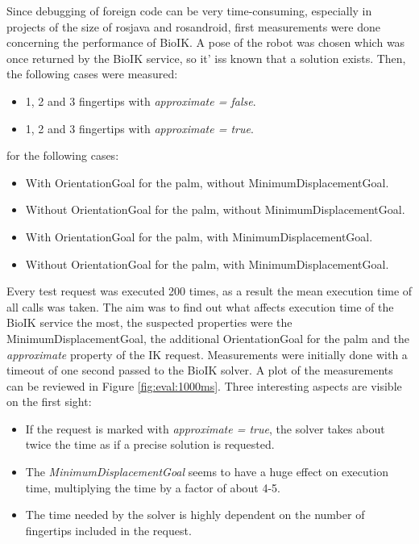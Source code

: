 Since debugging of foreign code can be very time-consuming, especially in projects of the size of rosjava and rosandroid, first measurements were done concerning the performance of BioIK. A pose of the robot was chosen which was once returned by the BioIK service, so it' iss known that a solution exists. Then, the following cases were measured:
\begin{itemize}
	\item 1, 2 and 3 fingertips with \textit{approximate = false}.
	\item 1, 2 and 3 fingertips with \textit{approximate = true}.
\end{itemize}

for the following cases:
\begin{itemize}
	\item With OrientationGoal for the palm, without MinimumDisplacementGoal.
	\item Without OrientationGoal for the palm, without MinimumDisplacementGoal.
	\item With OrientationGoal for the palm, with MinimumDisplacementGoal.
	\item Without OrientationGoal for the palm, with MinimumDisplacementGoal.
\end{itemize}

Every test request was executed 200 times, as a result the mean execution time of all calls was taken. The aim was to find out what affects execution time of the BioIK service the most, the suspected properties were the MinimumDisplacementGoal, the additional OrientationGoal for the palm and the \textit{approximate} property of the IK request. Measurements were initially done with a timeout of one second passed to the BioIK solver. A plot of the measurements can be reviewed in Figure \ref{fig:eval:1000ms}. Three interesting aspects are visible on the first sight:
\begin{itemize}
	\item If the request is marked with \textit{approximate = true}, the solver takes about twice the time as if a precise solution is requested.
	\item The \textit{MinimumDisplacementGoal} seems to have a huge effect on execution time, multiplying the time by a factor of about 4-5.
	\item The time needed by the solver is highly dependent on the number of fingertips included in the request. 
\end{itemize}

